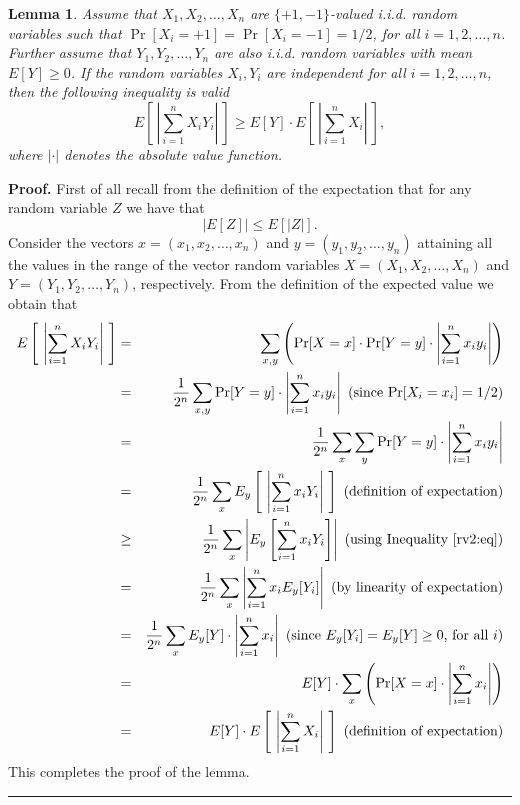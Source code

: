 \documentclass[12pt]{article}
\newtheorem{lemma}{Lemma}
\def\qed{\hfill\rule{2mm}{2mm}}
\begin{document}
\begin{lemma}
Assume that $X_1, X_2, \ldots , X_n$ are $\{ +1 , -1\}$-valued
i.i.d. random variables such that $\Pr [X_i = +1 ] = \Pr [X_i = -1 ]  =1/2$, for
all $i=1,2,\ldots ,n$. Further assume that
$Y_1, Y_2, \ldots , Y_n$ are also i.i.d. random variables with
mean $E[Y] \geq 0$. If the random variables
$X_i, Y_i$ are independent for all $i=1,2,\ldots ,n$, then
the following inequality is valid
\begin{equation}
\label{rv1:eq}
E\left[ ~\left| \sum_{i=1}^n X_i Y_i \right| ~ \right] \geq 
E[Y] \cdot E\left[ ~\left| \sum_{i=1}^n X_i \right| ~\right] ,
\end{equation}
where $| \cdot |$ denotes the absolute value function.
\end{lemma}
{\bf Proof.}
First of all recall from the definition of the expectation 
that for any random variable $Z$ we have that 
\begin{equation}
\label{rv2:eq}
| E[Z]| \leq E[|Z|] .
\end{equation}
Consider the vectors $x = (x_1, x_2 ,\ldots ,x_n)$ and
$y = (y_1, y_2, \ldots , y_n)$ attaining all the values in the
range of the vector random variables
$X = (X_1, X_2 ,\ldots ,X_n)$ and
$Y = (Y_1, Y_2, \ldots , Y_n)$, respectively. 
From the definition of the expected
value we obtain that
\begin{eqnarray*}
E\left[ ~\left| \sum_{i=1}^n X_i Y_i \right| ~\right]
& = &
\sum_{x,y} \left(
\Pr [X=x] \cdot \Pr [Y=y] \cdot \left| \sum_{i=1}^n x_i y_i \right| 
\right)\\
& = &
\frac{1}{2^n} 
\sum_{x,y} \Pr [Y=y] \cdot \left| \sum_{i=1}^n x_i y_i \right| 
\mbox{ (since $\Pr [X_i = x_i ] = 1/2$)} \\
& = &
\frac{1}{2^n} 
\sum_x \sum_y \Pr [Y=y] \cdot \left| \sum_{i=1}^n x_i y_i \right| \\
& = &
\frac{1}{2^n} 
\sum_x E_y \left[ ~\left| \sum_{i=1}^n x_i Y_i \right| ~\right] 
\mbox{ (definition of expectation)} \\
& \geq &
\frac{1}{2^n} 
\sum_x \left| E_y \left[  \sum_{i=1}^n x_i Y_i  \right] \right| 
\mbox{ (using Inequality~\ref{rv2:eq})} \\
& = &
\frac{1}{2^n} 
\sum_x \left|   \sum_{i=1}^n x_i E_y [ Y_i]  \right| 
\mbox{ (by linearity of expectation)} \\
& = &
\frac{1}{2^n} 
\sum_x E_y [Y] \cdot \left|   \sum_{i=1}^n x_i   \right| 
\mbox{ (since $E_y [Y_i] = E_y [Y] \geq 0$, for all $i$)} \\
& = &
E[Y] \cdot  \sum_x \left( \Pr [X = x] \cdot \left|   \sum_{i=1}^n x_i   \right| \right)\\
& = &
E[Y] \cdot E\left[ ~\left| \sum_{i=1}^n X_i \right| ~\right] 
\mbox{ (definition of expectation)} \\
\end{eqnarray*}
This completes the proof of the lemma.
\qed



%
%
%
\end{document}
